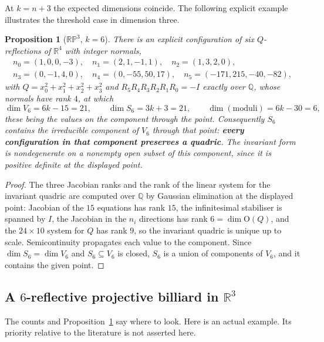 \documentclass[11pt,a4paper]{article}
\theoremstyle{plain}
\newtheorem{proposition}[theorem]{Proposition}
\theoremstyle{definition}
\theoremstyle{remark}
\begin{document}
At $k=n+3$ the expected dimensions coincide. The following explicit example
illustrates the threshold case in dimension three.

\begin{proposition}[$\mathbb{RP}^3$, $k=6$]\label{prop:rp3}
There is an explicit configuration of six $Q$-reflections of $\mathbb{R}^4$ with
integer normals,
\[
\begin{gathered}
  n_0=(1,0,0,-3),\quad n_1=(2,1,-1,1),\quad n_2=(1,3,2,0),\\
  n_3=(0,-1,4,0),\quad n_4=(0,-55,50,17),\quad n_5=(-171,215,-40,-82),
\end{gathered}
\]
with $Q=x_0^2+x_1^2+x_2^2+x_3^2$ and $R_5R_4R_3R_2R_1R_0=-I$ exactly over
$\mathbb{Q}$, whose normals have rank $4$, at which
\[
  \dim V_6=6k-15=21,\qquad \dim S_6=3k+3=21,\qquad \dim(\text{moduli})=6k-30=6 ,
\]
these being the values on the component through the point. Consequently $S_6$
contains the irreducible component of $V_6$ through that point: \textbf{every
configuration in that component preserves a quadric}. The invariant form is
nondegenerate on a nonempty open subset of this component, since it is positive
definite at the displayed point.
\end{proposition}

\begin{proof}
The three Jacobian ranks and the rank of the linear system for the invariant quadric
are computed over $\mathbb{Q}$ by Gaussian elimination at the displayed point:
Jacobian of the $15$ equations has rank $15$, the infinitesimal stabiliser is
spanned by $I$, the Jacobian in the $n_i$ directions has rank
$6=\dim\mathrm{O}(Q)$, and the $24\times10$ system for $Q$ has rank $9$, so the
invariant quadric is unique up to scale. Semicontinuity propagates each value to the
component. Since $\dim S_6=\dim V_6$ and $S_6\subseteq V_6$ is closed, $S_6$ is a
union of components of $V_6$, and it contains the given point.
\end{proof}

\subsection{A $6$-reflective projective billiard in $\mathbb{R}^3$}

The counts and Proposition~\ref{prop:rp3} say where to look. Here is an actual
example. Its priority relative to the literature is not asserted here.
\end{document}

